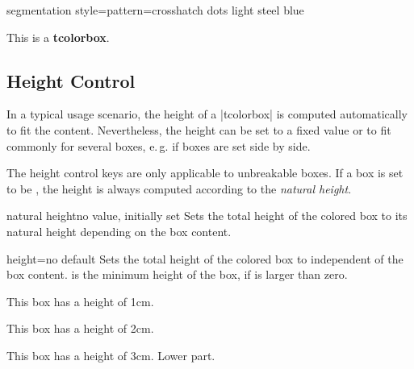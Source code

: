 \begin{dispExample*}{segmentation style={pattern=crosshatch dots light steel blue}}
\begin{tcolorbox}[enhanced jigsaw,fonttitle=\bfseries,title=This is a title,
  opacityframe=0.5,opacityback=0.25,opacitybacktitle=0.25,opacitytext=0.8,
  colback=red!5!white,colframe=red!75!black,colbacktitle=yellow!20!red]
This is a \textbf{tcolorbox}.
\end{tcolorbox}
\end{dispExample*}



\clearpage
\subsection{Height Control}
In a typical usage scenario, the height of a |tcolorbox| is computed automatically
to fit the content. Nevertheless, the height can be set to a fixed value
or to fit commonly for several boxes, e.\,g. if boxes are set side by side.

\bigskip
\begin{marker}
  The height control keys are only applicable to unbreakable boxes.
  If a box is set to be , the height is always
  computed according to the \emph{natural height}.
\end{marker}
\bigskip


\begin{docTcbKey}{natural height}{}{no value, initially set}
  Sets the total height of the colored box to its natural height depending
  on the box content.
\end{docTcbKey}

\begin{docTcbKey}{height}{=}{no default}
  Sets the total height of the colored box to  independent
  of the box content.  is the minimum height of the box, if
   is larger than zero.
\begin{dispExample}

\begin{tcolorbox}[height=1cm,valign=center]
  This box has a height of 1cm.
\end{tcolorbox}
\begin{tcolorbox}[height=2cm,valign=center]
  This box has a height of 2cm.
\end{tcolorbox}
\begin{tcolorbox}[height=3cm,split=0.5,valign=center,valign lower=center]
  This box has a height of 3cm.
  \tcblower
  Lower part.
\end{tcolorbox}
\end{dispExample}
\end{docTcbKey}

